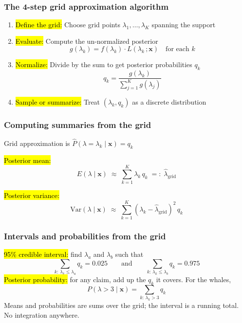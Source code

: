 \documentclass[slidestop,compress,mathserif]{beamer}
\begin{document}
\begin{frame}
\frametitle{The 4-step grid approximation algorithm}

\begin{enumerate}
    \item \hl{Define the grid:} Choose grid points $\lambda_1, \ldots, \lambda_K$ spanning the support
    \medskip
    \item \hl{Evaluate:} Compute the un-normalized posterior
    \[
    g(\lambda_k) = f(\lambda_k) \cdot L(\lambda_k\,; \mathbf{x}) \quad \text{for each } k
    \]
    \medskip
    \item \hl{Normalize:} Divide by the sum to get posterior probabilities $q_k$
    \[
    q_k = \frac{g(\lambda_k)}{\sum_{j=1}^K g(\lambda_j)}
    \]
    \medskip
    \item \hl{Sample or summarize:} Treat $(\lambda_k, q_k)$ as a discrete distribution
\end{enumerate}
\end{frame}

\begin{frame}
\frametitle{Computing summaries from the grid}

Grid approximation is $\hat P(\lambda = \lambda_{k} \mid \mathbf{x}) = q_{k}$

\hl{Posterior mean:}
\[
E(\lambda \mid \mathbf{x}) \;\approx\; \sum_{k=1}^K \lambda_k \, q_k \;=:\; \hat\lambda_{\text{grid}}
\]
\pause

\hl{Posterior variance:}
\[
\text{Var}(\lambda \mid \mathbf{x}) \;\approx\; \sum_{k=1}^K (\lambda_k - \hat\lambda_{\text{grid}})^2 \, q_k
\]
\pause

\end{frame}

\begin{frame}
\frametitle{Intervals and probabilities from the grid}

\hl{95\% credible interval:} find $\lambda_a$ and $\lambda_b$ such that
\[
\sum_{k:\, \lambda_k \le \lambda_a} q_k = 0.025 \qquad \text{and} \qquad \sum_{k:\, \lambda_k \le \lambda_b} q_k = 0.975
\]
\pause
\hl{Posterior probability:} for any claim, add up the $q_k$ it covers. For the whales,
\[
P(\lambda > 3 \mid \mathbf{x}) = \sum_{k:\, \lambda_k > 3} q_k
\]
\pause
Means and probabilities are sums over the grid; the interval is a running total. No integration anywhere.

\end{frame}
\end{document}
